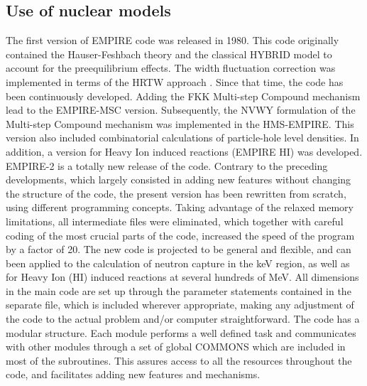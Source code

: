 \documentclass[twocolumn,amsmath,amssymb,10pt,groupedaddress,a4paper]{revtex4}
\begin{document}
\subsection{Use of nuclear models }
The first version of EMPIRE code was released in 1980. This code originally
contained the Hauser-Feshbach theory and the
classical HYBRID model to account for the preequilibrium
effects. The width fluctuation correction was implemented in terms
of the HRTW approach \cite{HRTW,HHM}. Since that time, the code has
been continuously developed. Adding the FKK Multi-step Compound
mechanism \cite{FKK} lead to the EMPIRE-MSC version. Subsequently,
the NVWY formulation of the Multi-step Compound mechanism
\cite{NVWY} was implemented in the HMS-EMPIRE. This version also
included combinatorial calculations of particle-hole level densities.
In addition, a version for Heavy Ion induced reactions (EMPIRE HI)
was developed.
EMPIRE-2 is a totally new release of the code. Contrary to the preceding
developments, which largely consisted in adding new features without
changing the structure of the code, the present version has been rewritten
from scratch, using different programming concepts. Taking advantage
of the relaxed memory limitations, all intermediate files were eliminated,
which together with careful coding of the most crucial parts of the
code, increased the speed of the program by a factor of 20. The new
code is projected to be general and flexible, and can been applied
to the calculation of neutron capture in the keV region, as well as
for Heavy Ion (HI) induced reactions at several hundreds of MeV. All
dimensions in the main code are set up through the parameter statements
contained in the separate file, which is included wherever appropriate,
making any adjustment of the code to the actual problem and/or computer
straightforward. The code has a modular structure. Each module performs
a well defined task and communicates with other modules through a
set of global COMMONS which are included in most of the subroutines.
This assures access to all the resources throughout the code, and
facilitates adding new features and mechanisms.
\end{document}
